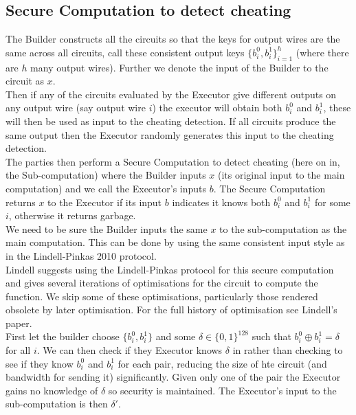 \documentclass[ %
                    author={Nicholas Tutte},
                supervisor={Prof. Nigel Smart},
                    degree={MEng},
                     title={Secure Two Party Computation},
                  subtitle={A practical comparison of recent protocols},
                      type={Research - GG1K},
                      year={2015} ]{dissertation}
\begin{document}
			\subsection{Secure Computation to detect cheating}
				The Builder constructs all the circuits so that the keys for output wires are the same across all circuits, call these consistent output keys $\{b_i^0, b_i^1\}_{i = 1}^{h}$ (where there are $h$ many output wires). Further we denote the input of the Builder to the circuit as $x$.\\

				Then if any of the circuits evaluated by the Executor give different outputs on any output wire (say output wire $i$) the executor will obtain both $b_i^0$ and $b_i^1$, these will then be used as input to the cheating detection. If all circuits produce the same output then the Executor randomly generates this input to the cheating detection.\\
					
				The parties then perform a Secure Computation to detect cheating (here on in, the Sub-computation) where the Builder inputs $x$ (its original input to the main computation) and  we call the Executor's inputs $b$. The Secure Computation returns $x$ to the Executor if its input $b$ indicates it knows both $b_i^0$ and $b_i^1$ for some $i$, otherwise it returns garbage.\\

				We need to be sure the Builder inputs the same $x$ to the sub-computation as the main computation. This can be done by using the same consistent input style as in the Lindell-Pinkas 2010 protocol.\\

				Lindell suggests using the Lindell-Pinkas protocol for this secure computation and gives several iterations of optimisations for the circuit to compute the function. We skip some of these optimisations, particularly those rendered obsolete by later optimisation. For the full history of optimisation see Lindell's paper.\\

				First let the builder choose $\{b_i^0, b_i^1\}$ and some $\delta \in \{0, 1\}^{128}$ such that $b_i^0 \oplus b_i^1 = \delta$ for all $i$. We can then check if they Executor knows $\delta$ in rather than checking to see if they know $b_i^0$ and $b_i^1$ for each pair, reducing the size of hte circuit (and bandwidth for sending it) significantly. Given only one of the pair the Executor gains no knowledge of $\delta$ so security is maintained. The Executor's input to the sub-computation is then $\delta'$.\\
\end{document}

